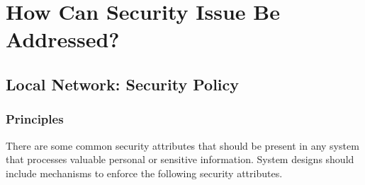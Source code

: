 \chapter{How Can Security Issue Be Addressed?}

\section{Local Network: Security Policy}

\subsection{Principles}
There are some common security attributes that should be present in any
system that processes valuable personal or sensitive information.
System designs should include mechanisms to enforce the following
security attributes.


